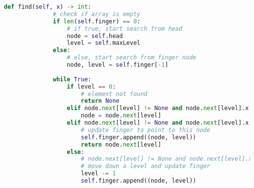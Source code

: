 \documentclass[addpoints]{exam}
\begin{document}
\begin{questions}
\begin{solution}
\begin{lstlisting}[language=Python]
          def find(self, x) -> int:
              # check if array is empty
              if len(self.finger) == 0:
                  # if true, start search from head
                  node = self.head
                  level = self.maxLevel
              else:
                  # else, start search from finger node
                  node, level = self.finger[-1]
      
              while True:
                  if level == 0:
                      # element not found
                      return None
                  elif node.next[level] != None and node.next[level].x < x:
                      node = node.next[level]
                  elif node.next[level] != None and node.next[level].x == x:
                      # update finger to point to this node
                      self.finger.append((node, level))
                      return node.next[level]
                  else:
                      # node.next[level] != None and node.next[level].x > x
                      # move down a level and update finger
                      level -= 1
                      self.finger.append((node, level))
          \end{lstlisting}
  \end{solution}


\end{questions}
\end{document}
